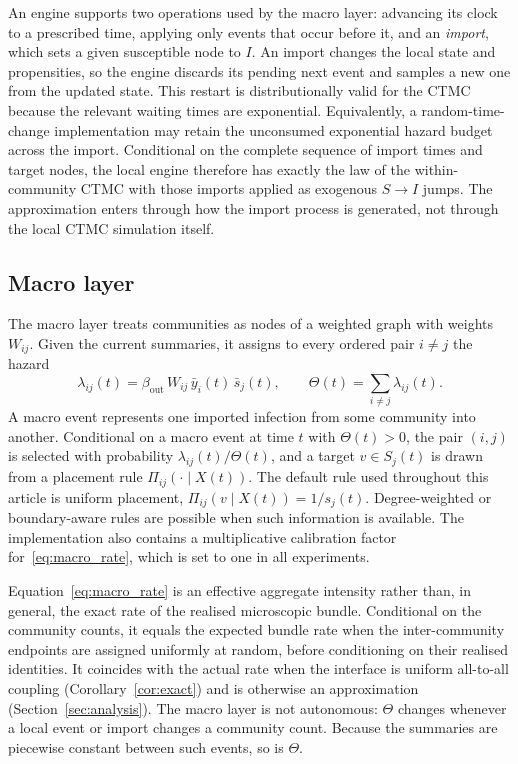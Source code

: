 \documentclass[a4paper,fleqn]{cas-sc}
\newcommand{\ibar}{\bar{y}}
\newcommand{\sbar}{\bar{s}}
\begin{document}
An engine supports two operations used by the macro layer: advancing its clock to a prescribed time, applying only events that occur before it, and an \emph{import}, which sets a given susceptible node to $I$. An import changes the local state and propensities, so the engine discards its pending next event and samples a new one from the updated state. This restart is distributionally valid for the CTMC because the relevant waiting times are exponential. Equivalently, a random-time-change implementation may retain the unconsumed exponential hazard budget across the import. Conditional on the complete sequence of import times and target nodes, the local engine therefore has exactly the law of the within-community CTMC with those imports applied as exogenous $S\to I$ jumps. The approximation enters through how the import process is generated, not through the local CTMC simulation itself.

\subsection{Macro layer}
\label{sec:macro}

The macro layer treats communities as nodes of a weighted graph with weights $W_{ij}$. Given the current summaries, it assigns to every ordered pair $i\neq j$ the hazard
\begin{equation}
\label{eq:macro_rate}
\lambda_{ij}(t)=\beta_{\mathrm{out}}\,W_{ij}\,\ibar_i(t)\,\sbar_j(t),
\qquad
\Theta(t)=\sum_{i\neq j}\lambda_{ij}(t).
\end{equation}
A macro event represents one imported infection from some community into another. Conditional on a macro event at time $t$ with $\Theta(t)>0$, the pair $(i,j)$ is selected with probability $\lambda_{ij}(t)/\Theta(t)$, and a target $v\in S_j(t)$ is drawn from a placement rule $\Pi_{ij}(\cdot\mid X(t))$. The default rule used throughout this article is uniform placement, $\Pi_{ij}(v\mid X(t))=1/s_j(t)$. Degree-weighted or boundary-aware rules are possible when such information is available. The implementation also contains a multiplicative calibration factor for~\eqref{eq:macro_rate}, which is set to one in all experiments.

Equation~\eqref{eq:macro_rate} is an effective aggregate intensity rather than, in general, the exact rate of the realised microscopic bundle. Conditional on the community counts, it equals the expected bundle rate when the inter-community endpoints are assigned uniformly at random, before conditioning on their realised identities. It coincides with the actual rate when the interface is uniform all-to-all coupling (Corollary~\ref{cor:exact}) and is otherwise an approximation (Section~\ref{sec:analysis}). The macro layer is not autonomous: $\Theta$ changes whenever a local event or import changes a community count. Because the summaries are piecewise constant between such events, so is $\Theta$.
\end{document}
